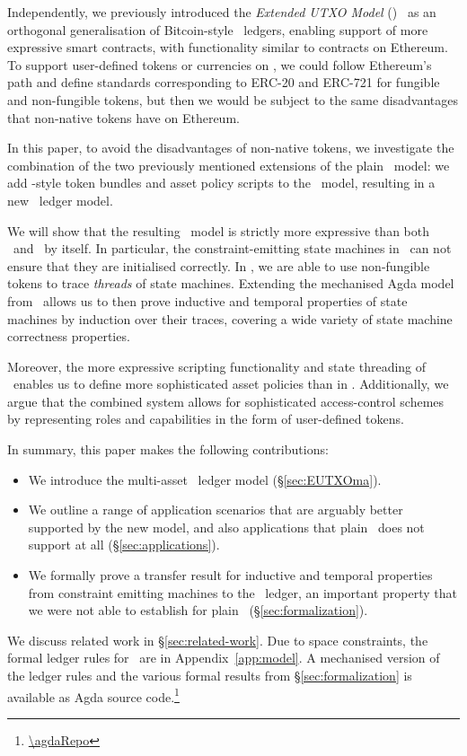 Independently, we previously introduced the \emph{Extended UTXO Model} (\EUTXO)~\cite{eutxo-1-paper} as an orthogonal generalisation of Bitcoin-style \UTXO\ ledgers, enabling support of more expressive smart contracts, with functionality similar to contracts on Ethereum. To support user-defined tokens or currencies on \EUTXO, we could follow Ethereum's path and define standards corresponding to ERC-20 and ERC-721 for fungible and non-fungible tokens, but then we would be subject to the same disadvantages that non-native tokens have on Ethereum.

In this paper, to avoid the disadvantages of non-native tokens, we investigate the combination of the two previously mentioned extensions of the plain \UTXO\ model: we add \UTXOma-style token bundles and asset policy scripts to the \EUTXO\ model, resulting in a new \EUTXOma\ ledger model.

We will show that the resulting \EUTXOma\ model is strictly more expressive than both \EUTXO\ and \UTXOma\ by itself. In particular, the constraint-emitting state machines in~\cite{eutxo-1-paper} can not ensure that they are initialised correctly. In \EUTXOma, we are able to use non-fungible tokens to trace \emph{threads} of state machines. Extending the mechanised Agda model from~\cite{eutxo-1-paper} allows us to then prove inductive and temporal properties of state machines by induction over their traces, covering a wide variety of state machine correctness properties.

Moreover, the more expressive scripting functionality and state threading of \EUTXO\ enables us to define more sophisticated asset policies than in \UTXOma. Additionally, we argue that the combined system allows for sophisticated access-control schemes by representing roles and capabilities in the form of user-defined tokens.

In summary, this paper makes the following contributions:
%
\begin{itemize}
\item We introduce the multi-asset \EUTXOma\ ledger model (\S\ref{sec:EUTXOma}).
\item We outline a range of application scenarios that are arguably better supported by the new model, and also applications that plain \UTXOma\ does not support at all (\S\ref{sec:applications}).
\item We formally prove a transfer result for inductive and temporal properties from constraint emitting machines to the \EUTXOma\ ledger, an important property that we were not able to establish for plain \EUTXO\ (\S\ref{sec:formalization}).
\end{itemize}
%
We discuss related work in \S\ref{sec:related-work}. Due to space constraints, the formal ledger rules for \EUTXOma\ are in Appendix~\ref{app:model}. A mechanised version of the ledger rules and the various formal results from \S\ref{sec:formalization} is available as Agda source code.\footnote{\url{\agdaRepo}}

